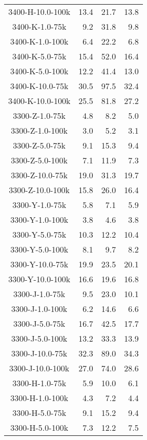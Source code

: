 \begin{longtable}{crrr}
    3400-H-10.0-100k &   13.4 &   21.7 &   13.8 \\
    3400-K-1.0-75k   &    9.2 &   31.8 &    9.8 \\
    3400-K-1.0-100k  &    6.4 &   22.2 &    6.8 \\
    3400-K-5.0-75k   &   15.4 &   52.0 &   16.4 \\
    3400-K-5.0-100k  &   12.2 &   41.4 &   13.0 \\
    3400-K-10.0-75k  &   30.5 &   97.5 &   32.4 \\
    3400-K-10.0-100k &   25.5 &   81.8 &   27.2 \\
    3300-Z-1.0-75k   &    4.8 &    8.2 &    5.0 \\
    3300-Z-1.0-100k  &    3.0 &    5.2 &    3.1 \\
    3300-Z-5.0-75k   &    9.1 &   15.3 &    9.4 \\
    3300-Z-5.0-100k  &    7.1 &   11.9 &    7.3 \\
    3300-Z-10.0-75k  &   19.0 &   31.3 &   19.7 \\
    3300-Z-10.0-100k &   15.8 &   26.0 &   16.4 \\
    3300-Y-1.0-75k   &    5.8 &    7.1 &    5.9 \\
    3300-Y-1.0-100k  &    3.8 &    4.6 &    3.8 \\
    3300-Y-5.0-75k   &   10.3 &   12.2 &   10.4 \\
    3300-Y-5.0-100k  &    8.1 &    9.7 &    8.2 \\
    3300-Y-10.0-75k  &   19.9 &   23.5 &   20.1 \\
    3300-Y-10.0-100k &   16.6 &   19.6 &   16.8 \\
    3300-J-1.0-75k   &    9.5 &   23.0 &   10.1 \\
    3300-J-1.0-100k  &    6.2 &   14.6 &    6.6 \\
    3300-J-5.0-75k   &   16.7 &   42.5 &   17.7 \\
    3300-J-5.0-100k  &   13.2 &   33.3 &   13.9 \\
    3300-J-10.0-75k  &   32.3 &   89.0 &   34.3 \\
    3300-J-10.0-100k &   27.0 &   74.0 &   28.6 \\
    3300-H-1.0-75k   &    5.9 &   10.0 &    6.1 \\
    3300-H-1.0-100k  &    4.3 &    7.2 &    4.4 \\
    3300-H-5.0-75k   &    9.1 &   15.2 &    9.4 \\
    3300-H-5.0-100k  &    7.3 &   12.2 &    7.5 \\

\end{longtable}

